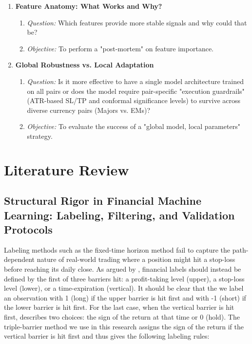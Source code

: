 \documentclass[12pt, a4paper]{article}
\begin{document}
\begin{enumerate}
  \item \textbf{Feature Anatomy: What Works and Why?}
  \begin{enumerate}
    \item \textit{Question:} Which features provide more stable signals and why could that be?
   \item \textit{Objective:} To perform a "post-mortem" on feature importance.
  \end{enumerate}
  

  \item \textbf{Global Robustness vs. Local Adaptation}
  \begin{enumerate}
    \item \textit{Question:} Is it more effective to have a single model architecture trained on all pairs 
    or does the model require pair-specific "execution guardrails" (ATR-based SL/TP and conformal significance levels) 
    to survive across diverse currency pairs (Majors vs. EMs)?
    \item \textit{Objective:} To evaluate the success of a "global model, local parameters" strategy.
  \end{enumerate}
\end{enumerate}


\section{Literature Review}

\subsection{Structural Rigor in Financial Machine Learning: Labeling, Filtering, and Validation Protocols}\label{sec:label_filter_validate}

Labeling methods such as the fixed-time horizon method fail to capture the path-dependent nature of real-world trading where a position might hit a stop-loss 
before reaching its daily close. As argued by \textcite{lopez_de_prado_advances_2018}, financial labels should instead be defined by the first of three barriers hit: 
a profit-taking level (upper), a stop-loss level (lower), or a time-expiration (vertical). It should be clear that the we label an observation with 1 (long) if the upper
barrier is hit first and with -1 (short) if the lower barrier is hit first. For the last case, when the vertical barrier is hit first, \textcite{lopez_de_prado_advances_2018}
describes two choices: the sign of the return at that time or 0 (hold). The triple-barrier method we use in this research assigns the sign of the return if the vertical
barrier is hit first and thus gives the following labeling rules:
\end{document}
